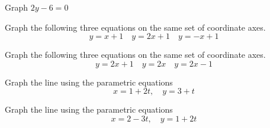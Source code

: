 \begin{puzzle}
    Graph \(2y - 6 = 0\)
\end{puzzle}

\begin{puzzle}
    Graph the following three equations on the same set of coordinate axes.
    \[
        y = x + 1 \quad y = 2x + 1 \quad y = -x + 1
    \]
\end{puzzle}

\begin{puzzle}
    Graph the following three equations on the same set of coordinate axes.
    \[
        y = 2x + 1 \quad y = 2x \quad y = 2x - 1
    \]
\end{puzzle}

\begin{puzzle}
    Graph the line using the parametric equations
    \[
        x = 1 + 2t, \quad y = 3 + t
    \]
\end{puzzle}

\begin{puzzle}
    Graph the line using the parametric equations
    \[
        x = 2 - 3t, \quad y = 1 + 2t
    \]
\end{puzzle}